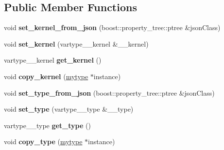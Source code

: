 \subsection*{Public Member Functions}
\begin{DoxyCompactItemize}
\item 
\mbox{\label{classfilter_1_1algos_1_1_blur_ad72f11d875fd7a6f92b6fc75214de215}} 
void {\bfseries set\+\_\+kernel\+\_\+from\+\_\+json} (boost\+::property\+\_\+tree\+::ptree \&json\+Class)
\item 
\mbox{\label{classfilter_1_1algos_1_1_blur_a9345e902819ccef5d00c9fd48ed4b4da}} 
void {\bfseries set\+\_\+kernel} (vartype\+\_\+\+\_\+kernel \&\+\_\+\+\_\+kernel)
\item 
\mbox{\label{classfilter_1_1algos_1_1_blur_a678681d563c2a5db25b443d80064d51f}} 
vartype\+\_\+\+\_\+kernel {\bfseries get\+\_\+kernel} ()
\item 
\mbox{\label{classfilter_1_1algos_1_1_blur_ae375ae0b8e78e641b20ecd27c356fa57}} 
void {\bfseries copy\+\_\+kernel} (\hyperlink{classfilter_1_1algos_1_1_blur}{mytype} $\ast$instance)
\item 
\mbox{\label{classfilter_1_1algos_1_1_blur_a16091140cd5ed5c0812713d2b744d532}} 
void {\bfseries set\+\_\+type\+\_\+from\+\_\+json} (boost\+::property\+\_\+tree\+::ptree \&json\+Class)
\item 
\mbox{\label{classfilter_1_1algos_1_1_blur_ab9ce4f25c743a49ca6f8659dee5c14c4}} 
void {\bfseries set\+\_\+type} (vartype\+\_\+\+\_\+type \&\+\_\+\+\_\+type)
\item 
\mbox{\label{classfilter_1_1algos_1_1_blur_a6d25c0aeaa2f58bee6385f5de4f1fc15}} 
vartype\+\_\+\+\_\+type {\bfseries get\+\_\+type} ()
\item 
\mbox{\label{classfilter_1_1algos_1_1_blur_acdef5b8517ff686b2425e994030249f7}} 
void {\bfseries copy\+\_\+type} (\hyperlink{classfilter_1_1algos_1_1_blur}{mytype} $\ast$instance)
\item 

\end{DoxyCompactItemize}
